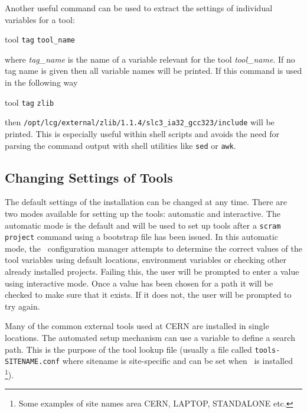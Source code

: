 \ni Another useful command can be used to extract the settings of
individual variables for a tool:

\begin{scramcmd}{tool}
  \texttt{tag} \texttt{tool\_name} 
\end{scramcmd}

\ni where \textit{tag\_name} is the name of a variable relevant for
the tool \textit{tool\_name}. If no tag name is given then all
variable names will be printed. If this command is used in the
following way

\begin{scramcmd}{tool}
  \texttt{tag} \texttt{zlib} 
\end{scramcmd}

\ni then \texttt{/opt/lcg/external/zlib/1.1.4/slc3\_ia32\_gcc323/include} will be printed.  This
is especially useful within shell scripts and avoids the need for
parsing the command output with shell utilities like \texttt{sed} or
\texttt{awk}.

\subsection{Changing Settings of Tools}\label{sec:changingtoolsettings}

The default settings of the installation can be changed at any time.
There are two modes available for setting up the tools: automatic and
interactive. The automatic mode is the default and will be used to set
up tools after a \texttt{scram project} command using a bootstrap file
has been issued. In this automatic mode, the \scram\ configuration
manager attempts to determine the correct values of the tool variables
using default locations, environment variables or checking other
already installed projects. Failing this, the user will be prompted to
enter a value using interactive mode.  Once a value has been chosen
for a path it will be checked to make sure that it exists. If it does
not, the user will be prompted to try again.

\ni Many of the common external tools used at CERN are installed in 
single locations. The automated setup mechanism can use a variable to
define a search path. This is the purpose of the tool lookup file (usually a file
called \texttt{tools-SITENAME.conf} where sitename is site-specific
and can be set when \scram\ is installed \footnote{Some examples of
  site names area CERN, LAPTOP, STANDALONE etc.}).  

